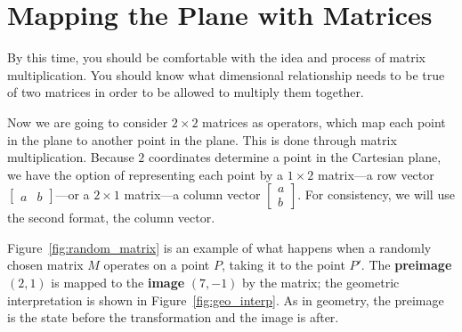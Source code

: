 \documentclass[../gatm.tex]{subfiles}
\begin{document}
\section{Mapping the Plane with Matrices}

By this time, you should be comfortable with the idea and process of matrix multiplication. You should know what dimensional relationship needs to be true of two matrices in order to be allowed to multiply them together.

Now we are going to consider $2\times 2$ matrices as operators, which map each point in the plane to another point in the plane. This is done through matrix multiplication. Because $2$ coordinates determine a point in the Cartesian plane, we have the option of representing each point by a $1\times 2$ matrix---a row vector $\left[\begin{array}{cc}a & b \end{array}\right]$---or a $2\times 1$ matrix---a column vector $\left[\begin{smallmatrix}a \\ b \end{smallmatrix}\right]$. For consistency, we will use the second format, the column vector.

Figure~\ref{fig:random_matrix} is an example of what happens when a randomly chosen matrix $M$ operates on a point $P$, taking it to the point $P'$. The \textbf{preimage} $(2,1)$ is mapped to the \textbf{image} $(7, -1)$ by the matrix; the geometric interpretation is shown in Figure~\ref{fig:geo_interp}. As in geometry, the preimage is the state before the transformation and the image is after.
\end{document}
